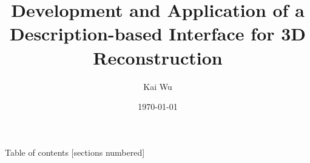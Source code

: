 \documentclass[10pt]{beamer}
\title[Interface of 3D Reconstruction]{Development and Application of a Description-based Interface for 3D Reconstruction} %
\author{Kai Wu}
\institute[UBC]
{
University of British Columbia \\ %
\medskip
kaywu@ece.ubc.ca \\ %
}
\date{\today}
\begin{document}
\begin{frame}
\maketitle
\end{frame}

\begin{frame}{Table of contents}
  [sections numbered]
  \tableofcontents[hideallsubsections]
\end{frame}


\end{document}
